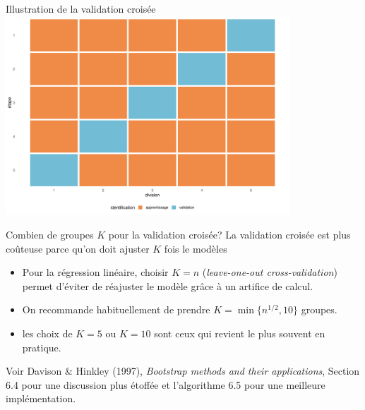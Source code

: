 \documentclass[
  ignorenonframetext,
]{beamer}
\providecommand{\tightlist}{%
  \setlength{\itemsep}{0pt}\setlength{\parskip}{0pt}}\usepackage{longtable,booktabs,array}
\begin{document}
\begin{frame}{Illustration de la validation croisée}
\protect\hypertarget{illustration-de-la-validation-croisuxe9e}{}
\includegraphics[width=0.8\textwidth,height=\textheight]{MATH60602-diapos4_files/figure-beamer/validationcroiseeillust-1.pdf}
\end{frame}

\begin{frame}{Combien de groupes \(K\) pour la validation croisée?}
\protect\hypertarget{combien-de-groupes-k-pour-la-validation-croisuxe9e}{}
La validation croisée est plus coûteuse parce qu'on doit ajuster \(K\)
fois le modèles

\begin{itemize}
\tightlist
\item
  Pour la régression linéaire, choisir \(K=n\) (\emph{leave-one-out
  cross-validation}) permet d'éviter de réajuster le modèle grâce à un
  artifice de calcul.
\item
  On recommande habituellement de prendre \(K=\min\{n^{1/2}, 10\}\)
  groupes.
\item
  les choix de \(K=5\) ou \(K=10\) sont ceux qui revient le plus souvent
  en pratique.
\end{itemize}

\footnotesize

Voir Davison \& Hinkley (1997), \emph{Bootstrap methods and their
applications}, Section 6.4 pour une discussion plus étoffée et
l'algorithme 6.5 pour une meilleure implémentation.

\normalsize
\end{frame}
\end{document}
